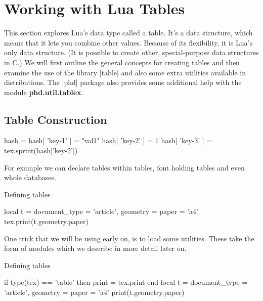 \chapter{Working with Lua Tables}

This section explores Lua's data type called a table. It's a data structure, which means that it lets
you combine other values. Because of its flexibility, it is Lua’s only data structure. (It is possible to
create other, special-purpose data structures in C.) We will first outline the general concepts for creating tables and then examine the use of the library |table| and also some extra utilities available in distributions. The |phd| package also provides some additional help with the module \textbf{phd.util.tablex}.

\section{Table Construction}


\begin{texexample}{}{}
\begin{luacode}
hash = {}
hash[ 'key-1' ] = "val1"
hash[ 'key-2' ] = 1
hash[ 'key-3' ] = {}
tex.sprint(hash['key-2'])
\end{luacode}
\end{texexample}

For example we can declare tables within tables, font holding tables and even whole databases.

\begin{texexample}{Defining tables}{}
\begin{luacode}
local t = {
    document_type = {'article'},
    geometry = {
       paper = 'a4'
     }
} 
tex.print(t.geometry.paper)
\end{luacode}
\end{texexample}

One trick that we will be using early on, is to load some utilities. These take the form of modules which we describe in more detail later on. 

\begin{texexample}{Defining tables}{}
\begin{luacode}
if type(tex) == 'table' then print = tex.print end
local t = {
    document_type = {'article'},
    geometry = {
       paper = 'a4'
     }
} 
print(t.geometry.paper)
\end{luacode}
\end{texexample}

